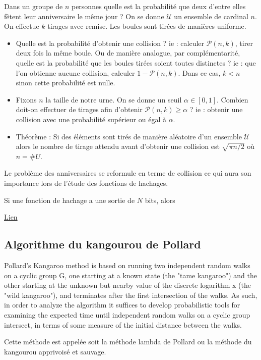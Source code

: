 Dans un groupe de $n$ personnes quelle est la probabilité que deux d'entre elles fêtent leur anniversaire le même jour ? On se donne $\mathcal{U}$ un ensemble de cardinal $n$. On effectue $k$ tirages avec remise. Les boules sont tirées de manières uniforme.
\begin{itemize}
    \item Quelle est la probabilité d'obtenir une collision ? ie : calculer $\mathcal{P}(n, k)$, tirer deux fois la même boule. Ou de manière analogue, par complémentarité, quelle est la probabilité que les boules tirées soient toutes distinctes ? ie : que l'on obtienne aucune collision, calculer  $1 - \mathcal{P}(n, k)$. Dans ce cas, $k < n$ sinon cette probabilité est nulle. 
    \item Fixons $n$ la taille de notre urne. On se donne un seuil $\alpha \in [0, 1]$. Combien doit-on effectuer de tirages afin d'obtenir $\mathcal{P}(n, k) \geq \alpha$ ? ie : obtenir une collision avec une probabilité supérieur ou égal à $\alpha$.
    \item Théorème : Si des éléments sont tirés de manière aléatoire d'un ensemble $\mathcal{U}$ alors le nombre de tirage attendu avant d'obtenir une collision est $\sqrt{\pi n / 2}$ où $n = \# U$.
\end{itemize}

Le problème des anniversaires se reformule en terme de collision ce qui aura son importance lors de l'étude des fonctions de hachages.

Si une fonction de hachage a une sortie de $N$ bits, alors 

\href{http://www.lifl.fr/~wegrzyno/portail/PAC/Doc/Cours/paradoxeAnniversaire.pdf}{Lien}


\subsection{Algorithme du kangourou de Pollard}
Pollard’s Kangaroo method is based on running two independent random walks on a cyclic group G, one starting at a known state (the "tame kangaroo") and the other starting at the unknown but nearby value of the discrete logarithm x (the "wild kangaroo"), and terminates after the first intersection of the walks. As such, in order to analyze the algorithm it suffices to develop probabilistic tools for examining the expected time until independent random walks on a cyclic group intersect, in terms of some measure of the initial distance between the walks.

Cette méthode est appelée soit la méthode lambda de Pollard ou la méthode du kangourou apprivoisé et sauvage.


